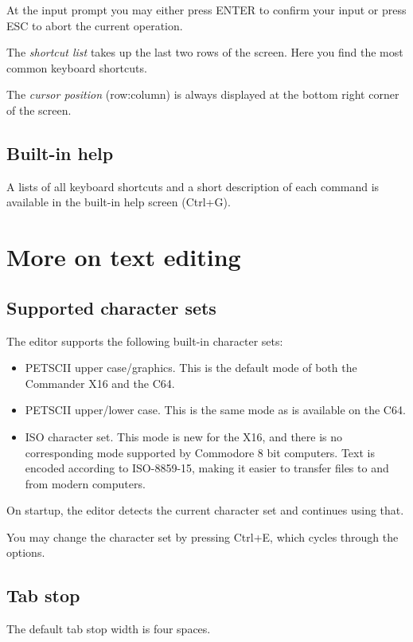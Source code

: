 \documentclass{article}
\begin{document}
        At the input prompt you may either press ENTER to confirm your input or press ESC 
        to abort the current operation.

        The \textit{shortcut list} takes up the last two rows of the screen. Here you find
        the most common keyboard shortcuts. 
        
        The \textit{cursor position} (row:column) is always displayed at the bottom right corner
        of the screen.

    \subsection{Built-in help}
        A lists of all keyboard shortcuts and a short description 
        of each command is available in the built-in help screen (Ctrl+G). 
    
\section{More on text editing}

    \subsection{Supported character sets}
        The editor supports the following built-in character sets:

        \begin{itemize}
            \item PETSCII upper case/graphics. This is the default mode of both the Commander X16 and the C64.

            \item PETSCII upper/lower case. This is the same mode as is available on the C64.

            \item ISO character set. This mode is new for the X16, and there is no corresponding mode 
            supported by Commodore 8 bit computers. Text is encoded according to ISO-8859-15, making it
            easier to transfer files to and from modern computers.
        \end{itemize}

        On startup, the editor detects the current character set and continues using that.

        You may change the character set by pressing Ctrl+E, which cycles through the options.

    \subsection{Tab stop}
        The default tab stop width is four spaces. 
        
\end{document}
